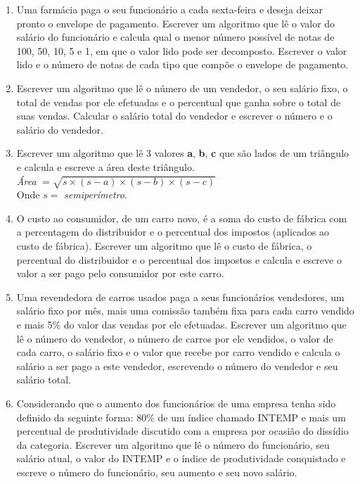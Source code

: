 \documentclass[onecolumn,a4paper,10pt]{report}
\newcommand{\+}{\, + \,}
\newcommand{\<}{\hspace*{-0.4cm}}
\begin{document}
\begin{enumerate}[1.]
\item Uma farmácia paga o seu funcionário a cada sexta-feira e deseja deixar pronto o envelope de pagamento. Escrever um algoritmo que lê o valor do salário do funcionário e calcula qual o menor número possível de notas de 100, 50, 10, 5 e 1, em que o valor lido pode ser decomposto. Escrever o valor lido e o número de notas de cada tipo que compõe o envelope de pagamento.

\item Escrever um algoritmo que lê o número de um vendedor, o seu salário fixo, o total de vendas por ele efetuadas e o percentual que ganha sobre o total de suas vendas. Calcular o salário total do vendedor e escrever o número e o salário do vendedor.

\item Escrever um algoritmo que lê 3 valores \textbf{a}, \textbf{b}, \textbf{c} que são lados de um triângulo e calcula e escreve a área deste triângulo.\\
\emph{Área} $ = \sqrt{s \times (s - a) \times (s - b) \times (s - c)}$\\
Onde $s = $ \emph{semiperímetro}.

\item O custo ao consumidor, de um carro novo, é a soma do custo de fábrica com a percentagem do distribuidor e o
percentual dos impostos (aplicados ao custo de fábrica). Escrever um algoritmo que lê o custo de fábrica, o
percentual do distribuidor e o percentual dos impostos e calcula e escreve o valor a ser pago pelo consumidor
por este carro.

\item Uma revendedora de carros usados paga a seus funcionários vendedores, um salário fixo por mês, mais uma
comissão também fixa para cada carro vendido e mais 5\% do valor das vendas por ele efetuadas. Escrever um
algoritmo que lê o número do vendedor, o número de carros por ele vendidos, o valor de cada carro, o salário
fixo e o valor que recebe por carro vendido e calcula o salário a ser pago a este vendedor, escrevendo o número
do vendedor e seu salário total.

\item Considerando que o aumento dos funcionários de uma empresa tenha sido definido da seguinte forma: 80\% de
um índice chamado INTEMP e mais um percentual de produtividade discutido com a empresa por ocasião do
dissídio da categoria. Escrever um algoritmo que lê o número do funcionário, seu salário atual, o valor do
INTEMP e o índice de produtividade conquistado e escreve o número do funcionário, seu aumento e seu novo
salário.


\end{enumerate}
\end{document}
